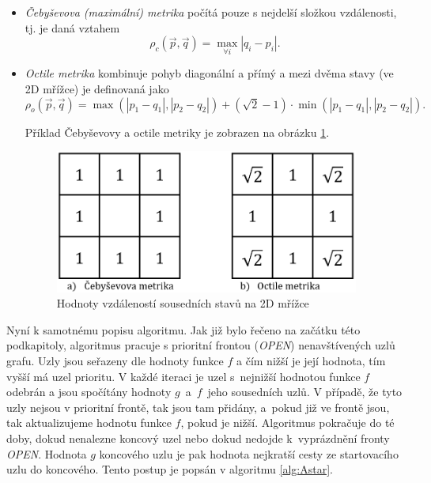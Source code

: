\begin{itemize}
	\item \emph{Čebyševova (maximální) metrika} počítá pouze s nejdelší složkou vzdálenosti, tj. je daná vztahem
	\begin{equation}
	\rho_c\left(\vec{p},\vec{q}\right)=\max_{\forall i}\left|q_i-p_i\right|.
	\end{equation}
	
%	
	
	\item \emph{Octile metrika} kombinuje pohyb diagonální a přímý a mezi dvěma stavy (ve 2D mřížce) je definovaná jako
	\begin{equation} \rho_o\left(\vec{p},\vec{q}\right)=\max\left(\left|p_1-q_1\right|,\left|p_2-q_2\right|\right)+(\sqrt{2}-1)\cdot \min\left(\left|p_1-q_1\right|,\left|p_2-q_2\right|\right).
	\end{equation}
	
	Příklad Čebyševovy a octile metriky je zobrazen na obrázku \ref{obr:metriky}.
	
	\begin{figure}[htb]
		\begin{center}
			\includegraphics*[width=10cm,keepaspectratio]{obr/metriky}
		\end{center}
		\caption{Hodnoty vzdáleností sousedních stavů na 2D mřížce}
		\label{obr:metriky}
	\end{figure}
	
\end{itemize} 

Nyní k samotnému popisu algoritmu. Jak již bylo řečeno na začátku této podkapitoly, algoritmus pracuje s prioritní frontou (\emph{OPEN}) nenavštívených uzlů grafu. Uzly jsou seřazeny dle hodnoty funkce $f$ a čím nižší je její hodnota, tím vyšší má uzel prioritu. V každé iteraci je uzel s~nejnižší hodnotou funkce $f$ odebrán a jsou spočítány hodnoty $g$~a~$f$~jeho sousedních uzlů. V případě, že tyto uzly nejsou v prioritní frontě, tak jsou tam přidány, a~pokud již ve frontě jsou, tak aktualizujeme hodnotu funkce $f$, pokud je nižší. Algoritmus pokračuje do té doby, dokud nenalezne koncový uzel nebo dokud nedojde k~vyprázdnění fronty \emph{OPEN}. Hodnota $g$ koncového uzlu je pak hodnota nejkratší cesty ze startovacího uzlu do koncového. Tento postup je popsán v algoritmu \ref{alg:Astar}.


